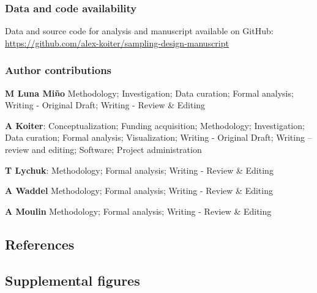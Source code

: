 \documentclass[
  number]{elsarticle}
\begin{document}
\subsubsection*{Data and code
availability}\label{data-and-code-availability}

Data and source code for analysis and manuscript available on GitHub:
\url{https://github.com/alex-koiter/sampling-design-manuscript}

\subsubsection*{Author contributions}\label{author-contributions}

\textbf{M Luna Miño} Methodology; Investigation; Data curation; Formal
analysis; Writing - Original Draft; Writing - Review \& Editing

\textbf{A Koiter}: Conceptualization; Funding acquisition; Methodology;
Investigation; Data curation; Formal analysis; Visualization; Writing -
Original Draft; Writing -- review and editing; Software; Project
administration

\textbf{T Lychuk}: Methodology; Formal analysis; Writing - Review \&
Editing

\textbf{A Waddel} Methodology; Formal analysis; Writing - Review \&
Editing

\textbf{A Moulin} Methodology; Formal analysis; Writing - Review \&
Editing

\subsection*{References}\label{references}

\renewcommand{\bibsection}{}


\subsection*{Supplemental figures}\label{supplemental-figures}
\end{document}
